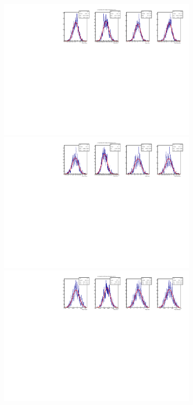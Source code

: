 \begin{figure}[t]
  \begin{center}
    \includegraphics[width=0.9\textwidth]{AA-Appdx-mcbootstrap/figs/1DPullPlot_p_0_RLogisticCalibration_MCTruth_Bd2JpsiKst_FullReweightAligned_SS_20171116_SSbarAccAsymmFTFloatDMGammaConstrAllSamples.pdf} \\
    \includegraphics[width=0.9\textwidth]{AA-Appdx-mcbootstrap/figs/1DPullPlot_p_1_RLogisticCalibration_MCTruth_Bd2JpsiKst_FullReweightAligned_SS_20171116_SSbarAccAsymmFTFloatDMGammaConstrAllSamples.pdf} \\
    \includegraphics[width=0.9\textwidth]{AA-Appdx-mcbootstrap/figs/1DPullPlot_dp_0_RLogisticCalibration_MCTruth_Bd2JpsiKst_FullReweightAligned_SS_20171116_SSbarAccAsymmFTFloatDMGammaConstrAllSamples.pdf} \\

\end{center}
\end{figure}
